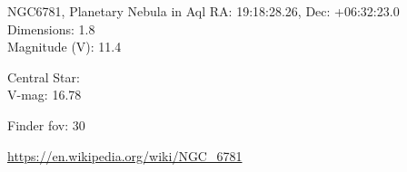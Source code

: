 \begin{block}{NGC6781, Planetary Nebula in Aql}
    RA: 19:18:28.26, Dec: +06:32:23.0 \\ 
    Dimensions: 1.8 \\ 
    Magnitude (V): 11.4


    Central Star: \\ 
      \hspace{1em}V-mag: 16.78 


    Finder fov: 30 

    \url{https://en.wikipedia.org/wiki/NGC_6781} 
\end{block}
